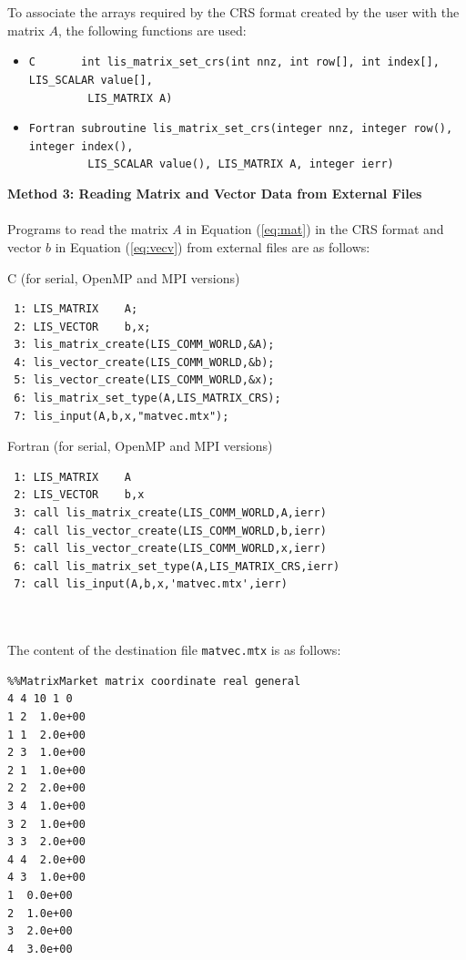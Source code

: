 \documentclass[a4paper]{article}
\begin{document}
To associate the arrays required by the CRS format created by the user with the matrix $A$, the following functions are used:
\begin{itemize}
\item \verb|C       int lis_matrix_set_crs(int nnz, int row[], int index[], LIS_SCALAR value[],|\\
      \verb|         LIS_MATRIX A)|
\item \verb|Fortran subroutine lis_matrix_set_crs(integer nnz, integer row(), integer index(),|\\
      \verb|         LIS_SCALAR value(), LIS_MATRIX A, integer ierr)|
\end{itemize}
\vspace*{5mm}
{\bf Method 3: Reading Matrix and Vector Data from External Files}\\
\\ \indent
Programs to read the matrix $A$ in Equation (\ref{eq:mat}) in the CRS format and 
vector $b$ in Equation (\ref{eq:vecv}) from external files are as follows: 
\begin{itembox}[l]{C (for serial, OpenMP and MPI versions)}
\small
\begin{verbatim}
 1: LIS_MATRIX    A;
 2: LIS_VECTOR    b,x;
 3: lis_matrix_create(LIS_COMM_WORLD,&A); 
 4: lis_vector_create(LIS_COMM_WORLD,&b); 
 5: lis_vector_create(LIS_COMM_WORLD,&x); 
 6: lis_matrix_set_type(A,LIS_MATRIX_CRS); 
 7: lis_input(A,b,x,"matvec.mtx"); 
\end{verbatim}
\end{itembox}
\begin{itembox}[l]{Fortran (for serial, OpenMP and MPI versions)}
\small
\begin{verbatim}
 1: LIS_MATRIX    A
 2: LIS_VECTOR    b,x
 3: call lis_matrix_create(LIS_COMM_WORLD,A,ierr) 
 4: call lis_vector_create(LIS_COMM_WORLD,b,ierr) 
 5: call lis_vector_create(LIS_COMM_WORLD,x,ierr) 
 6: call lis_matrix_set_type(A,LIS_MATRIX_CRS,ierr) 
 7: call lis_input(A,b,x,'matvec.mtx',ierr) 
\end{verbatim}
\end{itembox}
\\ \\
The content of the destination file {\tt matvec.mtx} is as follows:
{\small
\begin{verbatim}
%%MatrixMarket matrix coordinate real general
4 4 10 1 0
1 2  1.0e+00
1 1  2.0e+00
2 3  1.0e+00
2 1  1.0e+00
2 2  2.0e+00
3 4  1.0e+00
3 2  1.0e+00
3 3  2.0e+00
4 4  2.0e+00
4 3  1.0e+00
1  0.0e+00
2  1.0e+00
3  2.0e+00
4  3.0e+00
\end{verbatim}
}
\end{document}
